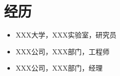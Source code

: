 \section*{经历}

\begin{itemize}
    \item XXX大学，XXX实验室，研究员
    \item XXX公司，XXX部门，工程师
    \item XXX公司，XXX部门，经理
\end{itemize}